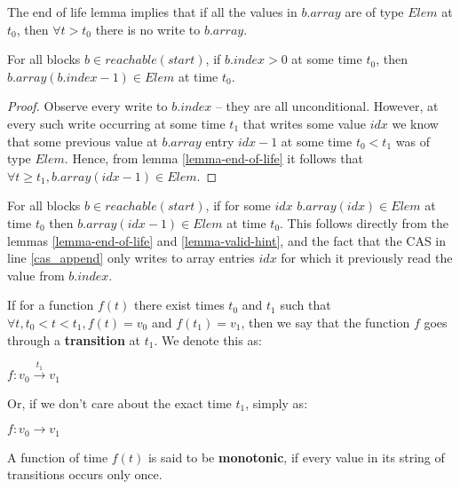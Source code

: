 \documentclass[runningheads,a4paper]{llncs}
\begin{document}
\begin{corollary}\label{cor-end-of-life}
The end of life lemma implies that if all the values in $b.array$ are
of type $Elem$ at $t_0$, then $\forall t > t_0$ there is no write to $b.array$.
\end{corollary}


\begin{lemma}\label{lemma-valid-hint}
For all blocks $b \in reachable(start)$, if $b.index > 0$ at some time $t_0$, then
$b.array(b.index - 1) \in Elem$ at time $t_0$.
\end{lemma}

\begin{proof}
Observe every write to $b.index$ -- they are all unconditional.
However, at every such write occurring at some time $t_1$ that writes
some value $idx$ we know that some previous value at $b.array$ entry $idx - 1$
at some time $t_0 < t_1$ was of type $Elem$.
Hence, from lemma \ref{lemma-end-of-life} it follows that
$\forall t \geq t_1, b.array(idx - 1) \in Elem$.
\end{proof}


\begin{corollary}[Compactness]\label{cor-compactness}
For all blocks $b \in reachable(start)$, if for some $idx$
$b.array(idx) \in Elem$ at time $t_0$ then $b.array(idx - 1) \in Elem$
at time $t_0$. This follows
directly from the lemmas \ref{lemma-end-of-life} and
\ref{lemma-valid-hint}, and the fact that the CAS in line
\ref{cas_append} only writes to array entries $idx$ for which it
previously read the value from $b.index$.
\end{corollary}


\begin{definition}[Transition]
If for a function $f(t)$ there exist times $t_0$ and $t_1$ such that
$\forall t, t_0 < t < t_1, f(t) = v_0$ and $f(t_1) = v_1$, then we say
that the function $f$ goes through a \textbf{transition} at $t_1$. We denote this as:

$f: v_0 \stackrel{t_1}{\rightarrow} v_1$

Or, if we don't care about the exact time $t_1$, simply as:

$f: v_0 \rightarrow v_1$
\end{definition}


\begin{definition}[Monotonicity]
A function of time $f(t)$ is said to be \textbf{monotonic}, if every value in its string of transitions occurs only once.
\end{definition}
\end{document}
